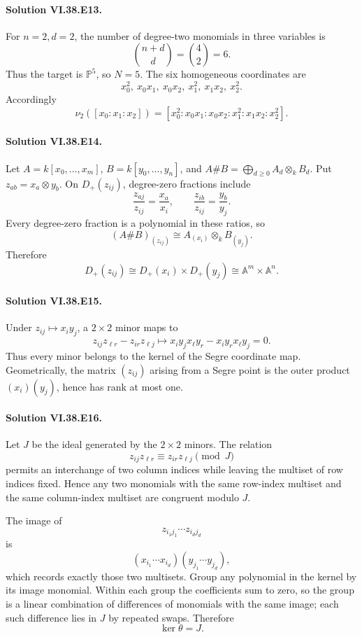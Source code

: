 \paragraph{Solution VI.38.E13.}
For \(n=2,d=2\), the number of degree-two monomials in three variables is
\[
\binom{n+d}{d}=\binom42=6.
\]
Thus the target is \(\mathbb P^5\), so \(N=5\).  The six homogeneous coordinates
are
\[
\boxed{x_0^2,\
 x_0x_1,\ x_0x_2,\ x_1^2,\ x_1x_2,\ x_2^2}.
\]
Accordingly
\[
\nu_2([x_0:x_1:x_2])
=[x_0^2:x_0x_1:x_0x_2:x_1^2:x_1x_2:x_2^2].
\]

\paragraph{Solution VI.38.E14.}
Let \(A=k[x_0,\ldots,x_m]\), \(B=k[y_0,\ldots,y_n]\), and
\(A\#B=\bigoplus_{d\ge0}A_d\otimes_kB_d\).  Put \(z_{ab}=x_a\otimes y_b\).
On \(D_+(z_{ij})\), degree-zero fractions include
\[
\frac{z_{aj}}{z_{ij}}=\frac{x_a}{x_i},
\qquad
\frac{z_{ib}}{z_{ij}}=\frac{y_b}{y_j}.
\]
Every degree-zero fraction is a polynomial in these ratios, so
\[
(A\#B)_{(z_{ij})}
\cong
A_{(x_i)}\otimes_k B_{(y_j)}.
\]
Therefore
\[
D_+(z_{ij})\cong D_+(x_i)\times D_+(y_j)\cong\mathbb A^m\times\mathbb A^n.
\]

\paragraph{Solution VI.38.E15.}
Under \(z_{ij}\mapsto x_i y_j\), a \(2\times2\) minor maps to
\[
z_{ij}z_{\ell r}-z_{ir}z_{\ell j}
\longmapsto
x_i y_jx_\ell y_r-x_i y_rx_\ell y_j=0.
\]
Thus every minor belongs to the kernel of the Segre coordinate map.  Geometrically,
the matrix \((z_{ij})\) arising from a Segre point is the outer product
\((x_i)(y_j)\), hence has rank at most one.

\paragraph{Solution VI.38.E16.}
Let \(J\) be the ideal generated by the \(2\times2\) minors.  The relation
\[
z_{ij}z_{\ell r}\equiv z_{ir}z_{\ell j}\pmod J
\]
permits an interchange of two column indices while leaving the multiset of row
indices fixed.  Hence any two monomials with the same row-index multiset and the
same column-index multiset are congruent modulo \(J\).

The image of
\[
z_{i_1j_1}\cdots z_{i_dj_d}
\]
is
\[
(x_{i_1}\cdots x_{i_d})(y_{j_1}\cdots y_{j_d}),
\]
which records exactly those two multisets.  Group any polynomial in the kernel by
its image monomial.  Within each group the coefficients sum to zero, so the group
is a linear combination of differences of monomials with the same image; each such
difference lies in \(J\) by repeated swaps. Therefore
\[
\boxed{\ker\theta=J}.
\]

